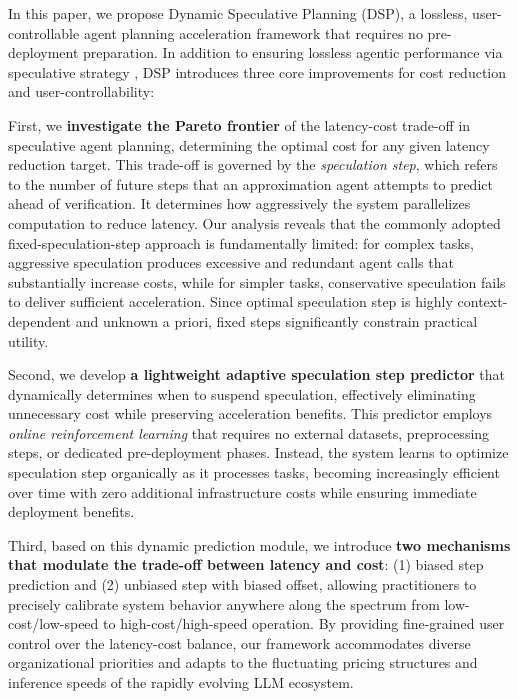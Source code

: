 In this paper, we propose Dynamic Speculative Planning (DSP), a lossless, user-controllable agent planning acceleration framework that requires no pre-deployment preparation. In addition to ensuring lossless agentic performance via speculative strategy \citep{hua2024interactive}, DSP introduces three core improvements for cost reduction and user-controllability:

First, we \textbf{investigate the Pareto frontier} of the latency-cost trade-off in speculative agent planning, determining the optimal cost for any given latency reduction target. This trade-off is governed by the \emph{speculation step}, which refers to the number of future steps that an approximation agent attempts to predict ahead of verification. It determines how aggressively the system parallelizes computation to reduce latency. Our analysis reveals that the commonly adopted fixed-speculation-step approach \citep{hua2024interactive, leviathan2023fast} is fundamentally limited: for complex tasks, aggressive speculation produces excessive and redundant agent calls that substantially increase costs, while for simpler tasks, conservative speculation fails to deliver sufficient acceleration. Since optimal speculation step is highly context-dependent and unknown a priori, fixed steps significantly constrain practical utility.

Second, we develop \textbf{a lightweight adaptive speculation step predictor} that dynamically determines when to suspend speculation, effectively eliminating unnecessary cost while preserving acceleration benefits. This predictor employs \textit{online reinforcement learning} that requires no external datasets, preprocessing steps, or dedicated pre-deployment phases. Instead, the system learns to optimize speculation step organically as it processes tasks, becoming increasingly efficient over time with zero additional infrastructure costs while ensuring immediate deployment benefits.

Third, based on this dynamic prediction module, we introduce \textbf{two mechanisms that modulate the trade-off between latency and cost}: (1) biased step prediction and (2) unbiased step with biased offset, allowing practitioners to precisely calibrate system behavior anywhere along the spectrum from low-cost/low-speed to high-cost/high-speed operation. By providing fine-grained user control over the latency-cost balance, our framework accommodates diverse organizational priorities and adapts to the fluctuating pricing structures and inference speeds of the rapidly evolving LLM ecosystem.

